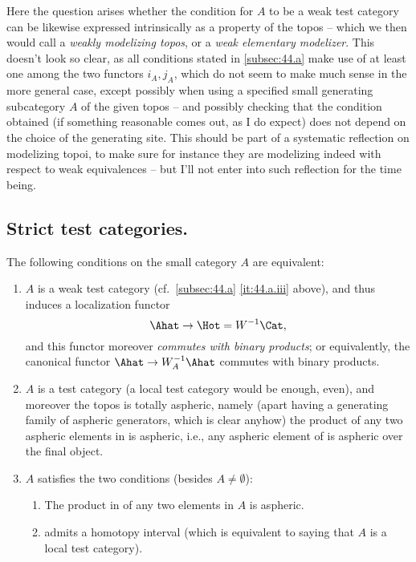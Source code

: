 Here the question arises whether the condition for $A$ to be a weak
test category can be likewise expressed intrinsically as a property of
the topos \Ahat{} -- which we then would call a \emph{weakly
  modelizing topos}, or a \emph{weak elementary modelizer}. This
doesn't look so clear, as all conditions stated in \ref{subsec:44.a}
make use of at least one among the two functors $i_A, j_A$, which do
not seem to make much sense in the more general case, except possibly
when using a specified small generating subcategory $A$ of the given
topos -- and possibly checking that the condition obtained (if
something reasonable comes out, as I do expect) does not depend on the
choice of the generating site. This should be part of a systematic
reflection on modelizing topoi, to make sure for instance they are
modelizing indeed with respect to weak equivalences -- but I'll not
enter into such reflection for the time being.

\subsection{Strict test categories.}
\label{subsec:44.c}
The following conditions on the small category $A$ are equivalent:
\begin{enumerate}[label=(\roman*)]
\item\label{it:44.c.i}
  $A$ is a weak test category (cf.\ \ref{subsec:44.a}
  \ref{it:44.a.iii} above), and thus induces a localization functor
  \[ \Ahat \to \Hot=W^{-1}\Cat,\]
  and this functor moreover \emph{commutes with binary products}; or
  equivalently, the canonical functor $\Ahat\to W_A^{-1}\Ahat$
  commutes with binary products.
\item\label{it:44.c.ii}
  $A$ is a test category (a local test category would be enough,
  even), and moreover the topos \Ahat{} is totally aspheric, namely
  (apart having a generating family of aspheric generators, which is
  clear anyhow) the product of any two aspheric elements in \Ahat{} is
  aspheric, i.e., any aspheric element of \Ahat{} is aspheric over the
  final object.
\item\label{it:44.c.iii}
  $A$ satisfies the two conditions (besides $A \neq \emptyset$):
  \begin{enumerate}[label=T~\arabic*),start=2]
  \item\label{it:44.T2}
    The product in \Ahat{} of any two elements in $A$ is aspheric.
  \item\label{it:44.T3}
    \Ahat{} admits a homotopy interval (which is equivalent to saying
    that $A$ is a local test category).
  \end{enumerate}
\end{enumerate}

